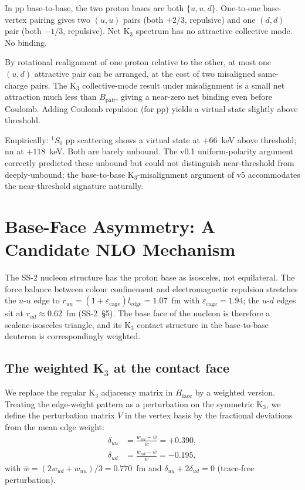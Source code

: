 \documentclass[11pt,letterpaper]{article}
\newcommand{\Bpair}{B_{\mathrm{pair}}}
\newcommand{\ledge}{l_{\mathrm{edge}}}
\newcommand{\epscage}{\varepsilon_{\mathrm{cage}}}
\begin{document}
In pp base-to-base, the two proton bases are both $\{u, u, d\}$. One-to-one base-vertex pairing gives two $(u, u)$ pairs (both $+2/3$, repulsive) and one $(d, d)$ pair (both $-1/3$, repulsive). Net K$_3$ spectrum has no attractive collective mode. No binding.

By rotational realignment of one proton relative to the other, at most one $(u, d)$ attractive pair can be arranged, at the cost of two misaligned same-charge pairs. The K$_3$ collective-mode result under misalignment is a small net attraction much less than $\Bpair$, giving a near-zero net binding even before Coulomb. Adding Coulomb repulsion (for pp) yields a virtual state slightly above threshold.

Empirically: $^1S_0$ pp scattering shows a virtual state at $+66$~keV above threshold; nn at $+118$~keV. Both are barely unbound. The v0.1 uniform-polarity argument correctly predicted these unbound but could not distinguish near-threshold from deeply-unbound; the base-to-base K$_3$-misalignment argument of v5 accommodates the near-threshold signature naturally.

\section{Base-Face Asymmetry: A Candidate NLO Mechanism}
\label{sec:Bface}

The SS-2 nucleon structure has the proton base as isosceles, not equilateral. The force balance between colour confinement and electromagnetic repulsion stretches the $u$-$u$ edge to $r_{uu} = (1 + \epscage) \ledge = 1.07$~fm with $\epscage = 1.94$; the $u$-$d$ edges sit at $r_{ud} \approx 0.62$~fm (SS-2~§5). The base face of the nucleon is therefore a scalene-isosceles triangle, and its K$_3$ contact structure in the base-to-base deuteron is correspondingly weighted.

\subsection{The weighted K$_3$ at the contact face}

We replace the regular K$_3$ adjacency matrix in $H_{\mathrm{face}}$ by a weighted version. Treating the edge-weight pattern as a perturbation on the symmetric K$_3$, we define the perturbation matrix $V$ in the vertex basis by the fractional deviations from the mean edge weight:
\begin{align*}
\delta_{uu} &= \frac{w_{uu} - \bar w}{\bar w} = +0.390, \\
\delta_{ud} &= \frac{w_{ud} - \bar w}{\bar w} = -0.195,
\end{align*}
with $\bar w = (2 w_{ud} + w_{uu})/3 = 0.770$~fm and $\delta_{uu} + 2\delta_{ud} = 0$ (trace-free perturbation).
\end{document}
